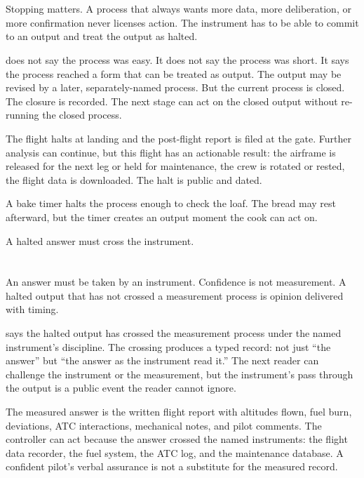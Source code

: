 \section{}
\label{se:halted}

Stopping matters. A process that always wants more data, more
deliberation, or more confirmation never licenses action. The
instrument has to be able to commit to an output and treat the output
as halted.

 does not say the process was easy. It does not say the
process was short. It says the process reached a form that can be
treated as output. The output may be revised by a later,
separately-named process. But the current process is closed. The
closure is recorded. The next stage can act on the closed output
without re-running the closed process.

The flight halts at landing and the post-flight report is filed at the
gate. Further analysis can continue, but this flight has an actionable
result: the airframe is released for the next leg or held for
maintenance, the crew is rotated or rested, the flight data is
downloaded. The halt is public and dated.

A bake timer halts the process enough to check the loaf. The bread may
rest afterward, but the timer creates an output moment the cook can
act on.

A halted answer must cross the instrument.

\section{}
\label{se:measured}

An answer must be taken by an instrument. Confidence is not
measurement. A halted output that has not crossed a measurement
process is opinion delivered with timing.

 says the halted output has crossed the measurement
process under the named instrument's discipline. The crossing produces
a typed record: not just ``the answer'' but ``the answer as the
instrument read it.'' The next reader can challenge the instrument or
the measurement, but the instrument's pass through the output is a
public event the reader cannot ignore.

The measured answer is the written flight report with altitudes flown,
fuel burn, deviations, ATC interactions, mechanical notes, and pilot
comments. The controller can act because the answer crossed the named
instruments: the flight data recorder, the fuel system, the ATC log,
and the maintenance database. A confident pilot's verbal assurance is
not a substitute for the measured record.

